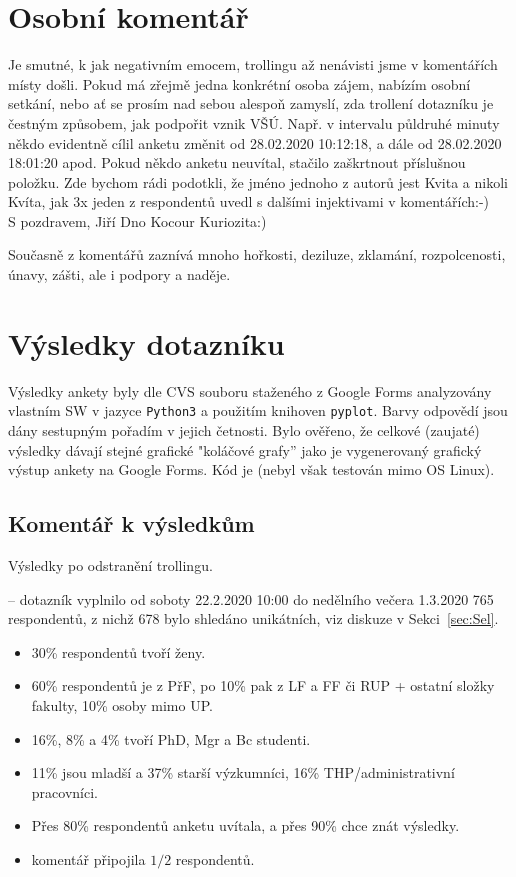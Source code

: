 \documentclass[a4paper,twoside]{article}
\begin{document}
\section{Osobní komentář}
Je smutné, k jak negativním emocem, trollingu až nenávisti jsme v komentářích místy došli.
Pokud má zřejmě jedna konkrétní osoba zájem, nabízím osobní setkání, nebo ať se prosím nad sebou alespoň zamyslí, zda trollení dotazníku je čestným způsobem, jak podpořit vznik VŠÚ. Např. v intervalu půldruhé minuty někdo evidentně cílil anketu změnit od 28.02.2020 10:12:18, a dále od 28.02.2020 18:01:20 apod.
Pokud někdo anketu neuvítal, stačilo zaškrtnout příslušnou položku. Zde bychom rádi podotkli, že jméno jednoho z autorů jest Kvita a nikoli Kvíta, jak 3x jeden z respondentů uvedl s dalšími injektivami v komentářích:-) \\ S pozdravem, Jiří Dno Kocour Kuriozita:)

Současně z komentářů zaznívá mnoho hořkosti, deziluze, zklamání, rozpolcenosti, únavy, zášti, ale i podpory a naděje.

\section{Výsledky dotazníku}
Výsledky ankety byly dle CVS souboru staženého z Google Forms analyzovány vlastním SW v jazyce {\tt Python3} a použitím knihoven {\tt pyplot}.
Barvy odpovědí jsou dány sestupným pořadím v jejich četnosti.
Bylo ověřeno, že celkové (zaujaté) výsledky dávají stejné grafické "koláčové grafy'' jako je vygenerovaný grafický výstup ankety na Google Forms.
Kód je  (nebyl však testován mimo OS Linux).

\subsection{Komentář k výsledkům}

Výsledky po odstranění trollingu.

 -- dotazník vyplnilo od soboty 22.2.2020 10:00 do nedělního večera 1.3.2020 765 respondentů, z nichž 678 bylo shledáno unikátních, viz diskuze v Sekci~\ref{sec:Sel}.
\begin{itemize}
  \item 30\% respondentů tvoří ženy.
  \item 60\% respondentů je z PřF, po 10\% pak z LF a FF či RUP + ostatní složky fakulty, 10\% osoby mimo UP.
  \item 16\%, 8\% a 4\% tvoří PhD, Mgr a Bc studenti.
  \item 11\% jsou mladší a 37\% starší výzkumníci, 16\% THP/administrativní pracovníci.
  \item Přes 80\% respondentů anketu uvítala, a přes 90\% chce znát výsledky.
  \item komentář připojila $1/2$ respondentů.
\end{itemize}
\end{document}
